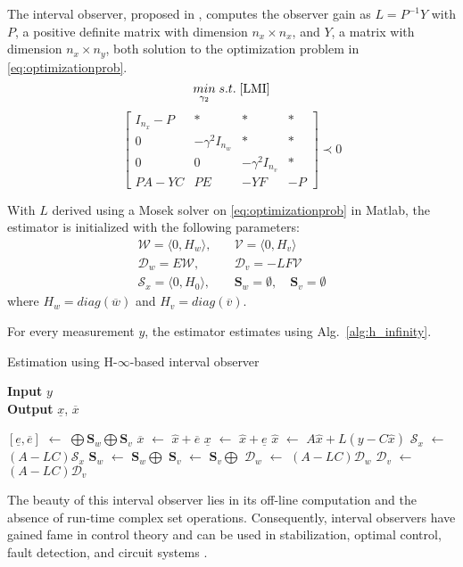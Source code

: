 The interval observer, proposed in \cite{Tang2019}, computes the observer gain as $L= P^{-1}Y$ with $P$, a positive definite matrix with dimension $n_x \times n_x$, and $Y$, a matrix with dimension $n_x \times n_y$, both solution to the optimization problem in \eqref{eq:optimizationprob}.
\begin{equation}
\label{eq:optimizationprob}
\underset{\gamma _2}{min} \;
s.t. \; \eqref{LMI}
\end{equation} 
\begin{equation}
\label{LMI}
\left[\begin{matrix}
I_{n_x} -P & * & * & *\\
0 & -\gamma ^2 I_{n_w} & * &* \\
0 & 0 & -\gamma ^2 I_{n_v} & *\\
PA-YC & PE & -YF & -P
\end{matrix}\right]  \prec 0
\end{equation} 

With $L$ derived using a Mosek solver on \eqref{eq:optimizationprob} in Matlab\textsuperscript{\tiny\textregistered}, the estimator is initialized with the following parameters:\\
\begin{equation}
\begin{split}
\mathcal{W} = \langle 0, H_w\rangle,& \quad \mathcal{V} = \langle 0,H_v\rangle\\
\mathcal{D}_w = E\mathcal{W}, & \quad \mathcal{D}_v = -LF\mathcal{V}\\
\mathcal{S}_x= \langle 0, H_0\rangle, &\quad \textbf{S}_w = \emptyset,\quad \textbf{S}_v = \emptyset
\end{split}
\end{equation}
where $H_w = diag(\overline{w})$ and $H_v= diag(\overline{v})$.

For every measurement $y$, the estimator estimates using Alg.~\ref{alg:h_infinity}.
\begin{algorithm}[H]
		
        \caption{Estimation using H-$\infty$-based interval observer}
        \textbf{Input} $y$\\
 		\textbf{Output} $\underline{x}$, $\overline{x}$
        \begin{algorithmic}[1]
        \State $[\underline{e}, \overline{e}]$ $\gets$ $\bigoplus \textbf{S}_w \bigoplus \textbf{S}_v$ \label{alg:main_constraints}
        \State $\overline{x}$ $\gets$ $\hat{x} + \overline{e}$
        \State $\underline{x}$ $\gets$ $\hat{x} + \underline{e}$
        \State $\hat{x}$ $\gets$ $A\hat{x} + L(y- C\hat{x})$ \label{alg:main_reac}
        \State $\mathcal{S}_x$ $\gets$ $(A-LC)\mathcal{S}_x$
        \State $\textbf{S}_w$ $\gets$ $\textbf{S}_w \bigoplus$ 
        \State $\textbf{S}_v$ $\gets$ $\textbf{S}_v \bigoplus$ 
        \State $\mathcal{D}_w$ $\gets$ $(A-LC)\mathcal{D}_w$
        \State $\mathcal{D}_v$ $\gets$ $(A-LC)\mathcal{D}_v$
        \end{algorithmic}
        \label{alg:h_infinity}
\end{algorithm}

The beauty of this interval observer lies in its off-line computation and the absence of run-time complex set operations. Consequently, interval observers have gained fame in control theory and can be used in stabilization, optimal control, fault detection, and circuit systems \cite{Huang2019}.



